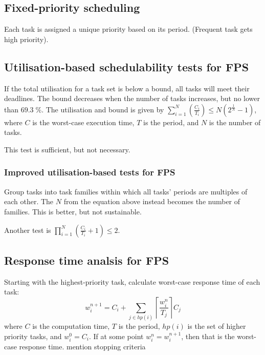 \documentclass[a4paper, 12pt]{article}
\newcommand{\comment}[1]{\textcolor{RedOrange}{#1}}
\begin{document}
\subsection{Fixed-priority scheduling}
Each task is assigned a unique priority based on its period. (Frequent task gets high priority).

\subsection{Utilisation-based schedulability tests for FPS}
If the total utilisation for a task set is below a bound, all tasks will meet their deadlines. The bound decreases when the number of tasks increases, but no lower than \(69.3 \; \% \). The utilisation and bound is given by \( \sum_{i=1}^{N} \left( \frac{C_i}{T_i} \right) \leq N (2^{\frac{1}{N}} - 1) \), where \(C\) is the worst-case execution time, \(T\) is the period, and \(N\) is the number of tasks.

This test is sufficient, but not necessary.

\subsubsection{Improved utilisation-based tests for FPS}
Group tasks into task families within which all tasks' periods are multiples of each other. The \(N\) from the equation above instead becomes the number of families. This is better, but not sustainable.

Another test is \( \prod_{i=1}^{N} \left( \frac{C_i}{T_i} + 1 \right) \leq 2 \).

\subsection{Response time analsis for FPS}\label{sec:rta}
Starting with the highest-priority task, calculate worst-case response time of each task:
\begin{equation*}
	w_i^{n+1} = C_i + \sum_{j \in hp(i)} \left\lceil \frac{w_i^n}{T_j} \right\rceil C_j
\end{equation*}
where \(C\) is the computation time, \(T\) is the period, \(hp(i)\) is the set of higher priority tasks, and \(w_i^0 = C_i\). If at some point \(w_i^n = w_i^{n+1}\), then that is the worst-case response time. \comment{mention stopping criteria}
\end{document}
